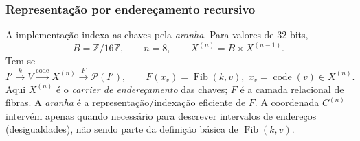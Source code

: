 \documentclass[11pt,a4paper]{article}
\begin{document}
\subsubsection{Representação por endereçamento recursivo}
\label{sec:fibras-repr}
A implementação indexa as chaves pela \emph{aranha}. Para valores de 32 bits,
\[
B=\mathbb Z/16\mathbb Z,\qquad n=8,\qquad X^{(n)}=B\times X^{(n-1)}.
\]
Tem-se
\[
I'
\xrightarrow{k}
V
\xrightarrow{\operatorname{code}}
X^{(n)}
\xrightarrow{F}
\mathcal P(I'),
\qquad
F(x_v)=\operatorname{Fib}(k,v),\; x_v=\operatorname{code}(v)\in X^{(n)}.
\]
Aqui $X^{(n)}$ é o \emph{carrier de endereçamento} das chaves; $F$ é a
camada relacional de fibras. A \emph{aranha} é a representação/indexação
eficiente de $F$. A coordenada $C^{(n)}$ intervém apenas quando necessário
para descrever intervalos de endereços (desigualdades), não sendo parte
da definição básica de $\operatorname{Fib}(k,v)$.
\end{document}
